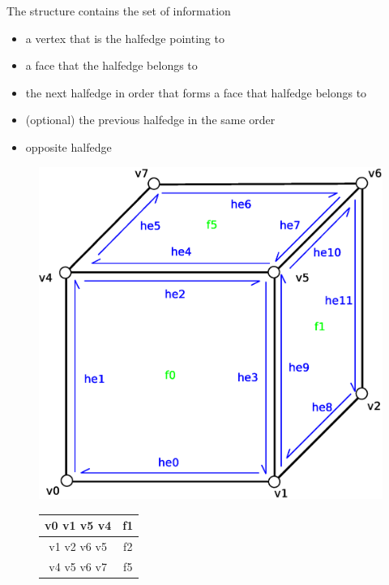 The structure contains the set of information
\begin{itemize}
\item a vertex that is the halfedge pointing to
\item a face that the halfedge belongs to
\item the next halfedge in order that forms a face that halfedge belongs to
\item (optional) the previous halfedge in the same order
\item opposite halfedge
\end{itemize}

\begin{figure}[h]

\begin{minipage}[hb]{0.65\linewidth}
\centering
\includegraphics[width=0.6\linewidth]{../img/he_rep_mesh.eps}
\label{fig:figure1}
\end{minipage}
\hspace{0.5cm}
\begin{minipage}[hb]{0.25\linewidth}
\centering
\begin{tabular}{|c|c|}
\hline
\textsf{v0 v1 v5 v4} & \textsf{f1}\\
\hline
\textsf{v1 v2 v6 v5} & \textsf{f2}\\
\hline
\textsf{v4 v5 v6 v7} & \textsf{f5}\\
\hline
\end{tabular}
\label{fig:figure2}
\end{minipage}

\end{figure}
